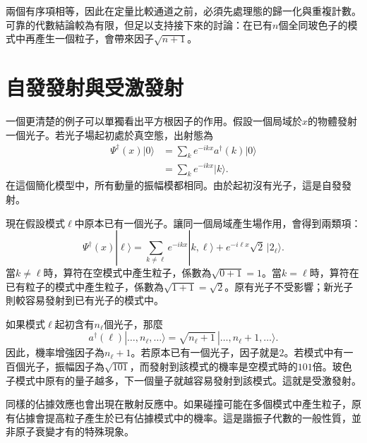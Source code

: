 兩個有序項相等，因此在定量比較通道之前，必須先處理態的歸一化與重複計數。可靠的代數結論較為有限，但足以支持接下來的討論：在已有\(n\)個全同玻色子的模式中再產生一個粒子，會帶來因子\(\sqrt{n+1}\)。

\section{自發發射與受激發射}

一個更清楚的例子可以單獨看出平方根因子的作用。假設一個局域於\(x\)的物體發射一個光子。若光子場起初處於真空態，出射態為
\begin{align}
\Psi^\dagger(x)|0\rangle
&=\sum_k e^{-ikx}a^\dagger(k)|0\rangle\\
&=\sum_k e^{-ikx}|k\rangle.
\end{align}
在這個簡化模型中，所有動量的振幅模都相同。由於起初沒有光子，這是自發發射。

現在假設模式\(\ell\)中原本已有一個光子。讓同一個局域產生場作用，會得到兩類項：
\begin{equation}
\Psi^\dagger(x)|\ell\rangle
=
\sum_{k\ne\ell}e^{-ikx}|k,\ell\rangle
+e^{-i\ell x}\sqrt{2}\,|2_\ell\rangle.
\end{equation}
當\(k\ne\ell\)時，算符在空模式中產生粒子，係數為\(\sqrt{0+1}=1\)。當\(k=\ell\)時，算符在已有粒子的模式中產生粒子，係數為\(\sqrt{1+1}=\sqrt{2}\)。原有光子不受影響；新光子則較容易發射到已有光子的模式中。

\begin{classroomqa}
\end{classroomqa}

如果模式\(\ell\)起初含有\(n_\ell\)個光子，那麼
\begin{equation}
a^\dagger(\ell)
|\ldots,n_\ell,\ldots\rangle
=
\sqrt{n_\ell+1}
\,|\ldots,n_\ell+1,\ldots\rangle.
\end{equation}
因此，機率增強因子為\(n_\ell+1\)。若原本已有一個光子，因子就是\(2\)。若模式中有一百個光子，振幅因子為\(\sqrt{101}\)，而發射到該模式的機率是空模式時的\(101\)倍。玻色子模式中原有的量子越多，下一個量子就越容易發射到該模式。這就是受激發射。

同樣的佔據效應也會出現在散射反應中。如果碰撞可能在多個模式中產生粒子，原有佔據會提高粒子產生於已有佔據模式中的機率。這是諧振子代數的一般性質，並非原子衰變才有的特殊現象。

